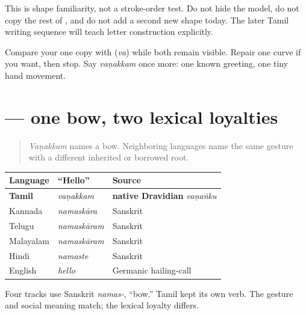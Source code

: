 This is shape familiarity, not a stroke-order test. Do not hide the model, do not copy the rest of \textbf{}, and do not add a second new shape today. The later Tamil writing sequence will teach letter construction explicitly.

\begin{tcolorbox}[breakable,colback=teal!4,colframe=teal!35!black,title={Before you move on}]
Compare your one copy with \textbf{} (\emph{va}) while both remain visible. Repair one curve if you want, then stop. Say \emph{vaṇakkam} once more: one known greeting, one tiny hand movement.
\end{tcolorbox}
\section[\texorpdfstring{\ta{வணக்கம்} / \ta{நமஸ்காரம்} (vaṇakkam / namaskāram)}{வணக்கம் / நமஸ்காரம் (vaṇakkam / namaskāram)}]{ — one bow, two lexical loyalties}

\label{lesson:TA-C01-vanakkam-family-register}



\begin{quote}
\emph{Vaṇakkam} names a bow. Neighboring languages name the same gesture with a different inherited or borrowed root.
\end{quote}

\begin{cousinweb}
\noindent
\begin{tabularx}{\linewidth}{@{}>{\raggedright\arraybackslash}X>{\raggedright\arraybackslash}X>{\raggedright\arraybackslash}X@{}}
\toprule
\textbf{Language} & \textbf{\textquotedblleft{}Hello\textquotedblright{}} & \textbf{Source} \\
\midrule
\textbf{Tamil} & \emph{vaṇakkam} & \textbf{native Dravidian} \emph{vaṇaṅku} \\
Kannada & \emph{namaskāra} & Sanskrit \\
Telugu & \emph{namaskāram} & Sanskrit \\
Malayalam & \emph{namaskāram} & Sanskrit \\
Hindi & \emph{namaste} & Sanskrit \\
English & \emph{hello} & Germanic hailing-call \\
\bottomrule
\end{tabularx}

Four tracks use Sanskrit \emph{namas-}, \textquotedblleft{}bow.\textquotedblright{} Tamil kept its own verb. The gesture and social meaning match; the lexical loyalty differs.
\end{cousinweb}

